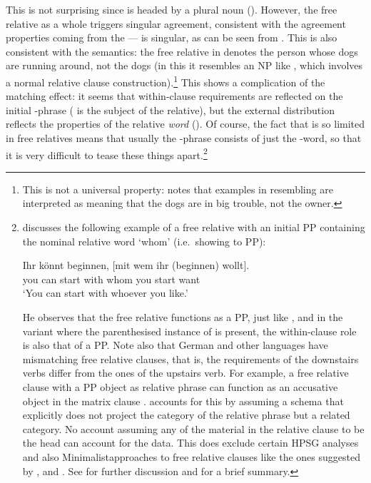 \documentclass[output=paper,biblatex,babelshorthands,newtxmath,draftmode,colorlinks,citecolor=brown]{langscibook}
\begin{document}
\largerpage[-1]
\noindent
This is not surprising since  is headed by a plural noun
(). However, the free relative as a whole triggers singular agreement,
consistent with the agreement properties coming from the  ---
 is singular, as can be seen from . This is also consistent with
the semantics: the free relative in  denotes the person whose dogs are running
around, not the dogs (in this it resembles an NP like , which involves a normal relative clause construction).\footnote{This is not a
  universal property: \citet{Borsley:08} notes that examples in  resembling
   are interpreted as meaning that the dogs are in big trouble, not the owner.}
This shows a complication of the matching effect: it seems that within-clause requirements
are reflected on the initial -phrase ( is the subject of the
relative), but the external distribution reflects the properties of the relative
\emph{word} (). Of course, the fact that  is so limited
in free relatives means that usually the -phrase consists of just the
-word, so that it is very difficult to tease these things
apart.\footnote{\label{fn:rc-5}\citet[90]{Mueller99b} discusses the following  example
  of a free relative with an initial PP containing the nominal relative word 
  `whom' (i.e.\ showing  to PP):
  \begin{exe}\ex\label{x:rc-157}
    \gll Ihr könnt beginnen, [mit wem ihr (beginnen) wollt].\\
         you can   start     \spacebr{}with whom you \hphantom{(}start want\\
    \glt `You can start with whoever you like.’
  \end{exe}
  He observes that the free relative functions as a PP, just like , and in
  the variant where the parenthesised instance of  is present, the within-clause
  role is also that of a PP. Note also that German and other languages have mismatching free
    relative clauses, that is, the requirements of the downstairs verbs differ from the ones of the
    upstairs verb. For example, a free relative clause with a PP object as relative phrase can
    function as an accusative object in the matrix clause \parencites[]{Bausewein90}[]{Mueller99b}. \citet[]{Mueller99b} accounts for this by assuming a schema that explicitly does not project
    the category of the relative phrase but a related category. No account assuming any of the
    material in the relative clause to be the head can account for the data. This does exclude
    certain HPSG analyses and also Minimalist\indexmp approaches to free relative clauses like the ones
    suggested by \citet{Donati2006a-u}, \citet{Ott2011a} and \citet{Chomsky2008a,Chomsky2013a}. See
     for further discussion and 
    for a brief summary.
}
\end{document}
